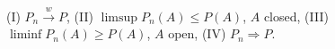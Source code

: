 (I) $P_n \xrightarrow{w} P$,
(II) $\limsup P_n(A) \leq P(A)$, $A$ closed,
(III) $\liminf P_n(A) \geq P(A)$, $A$ open,
(IV) $P_n \Rightarrow P$.
